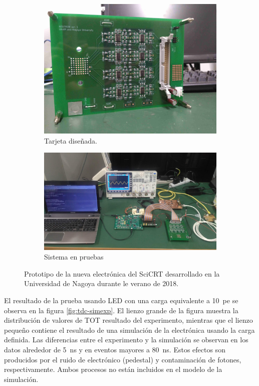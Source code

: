 \begin{figure}
  \centering
  \begin{subfigure}[b]{0.49\textwidth}
	\includegraphics[width=\textwidth]{neutron_ver1.jpg}
	\caption{Tarjeta diseñada.}
	\label{fig:neutron-pcb}
  \end{subfigure}
  \begin{subfigure}[b]{0.49\textwidth}
	\includegraphics[width=\textwidth]{complete-system.jpg}
	\caption{Sistema en pruebas}
	\label{fig:complete-sys}
  \end{subfigure}
  \caption{Prototipo de la nueva electrónica del SciCRT desarrollado en la Universidad de Nagoya durante le verano de \num{2018}.}
  \label{fig:new-electronics}
\end{figure}

El resultado de la prueba usando LED con una carga equivalente a \SI{10}{pe} se observa en la figura \ref{fig:tdc-simexp}. El lienzo grande de la figura muestra la distribución de valores de TOT resultado del experimento, mientras que el lienzo pequeño contiene el resultado de una simulación de la electrónica usando la carga definida. Las diferencias entre el experimento y la simulación se observan en los datos alrededor de \SI{5}{\ns} y en eventos mayores a \SI{80}{\ns}. Estos efectos son producidos por el ruido de electrónico (pedestal) y contaminación de fotones, respectivamente. Ambos procesos no están incluidos en el modelo de la simulación.

